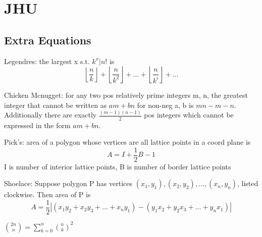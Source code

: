\chapter{JHU}

\section{Extra Equations}
Legendres: the largest x s.t. $k^{x} | n!$ is
\[ \left \lfloor{\frac{n}{k}}\right \rfloor + \left \lfloor{\frac{n}{k^{2}}}\right \rfloor + ... + \left \lfloor{\frac{n}{k^{i}}}\right \rfloor + ...\]

Chicken Mcnugget: for any two pos relatively prime integers m, n, the greatest integer that cannot be written as $am+bn$ for non-neg a, b is $mn-m-n$. Additionally
there are exactly $\frac{(m-1)(n-1)}{2}$ pos integers which cannot be expressed in the form $am+bn$.

Pick's: area of a polygon whose vertices are all lattice points in a coord plane is 
\[ A = I + \frac{1}{2}B-1\]
I is number of interior lattice points, B is number of border lattice points

Shoelace: Suppose polygon P has vertices $(x_1, y_1), (x_2, y_2), ..., (x_n, y_n)$, listed clockwise. Then area of P is
\[ A = \frac{1}{2}|(x_1y_2 + x_2y_3 + ... + x_ny_1) - (y_1x_2+y_2x_3+...+y_nx_1)|\]

${2n \choose n} = \sum_{k=0}^{n}{n \choose k}^{2}$
